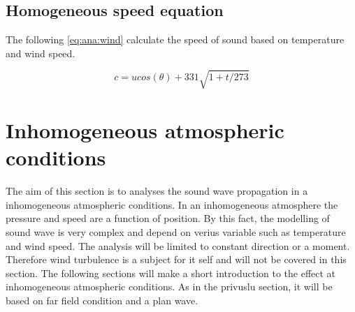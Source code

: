  
 \subsection{Homogeneous speed equation}
 The following \autoref{eq:ana:wind} calculate the speed of sound based on temperature and wind speed.

\begin{equation}\label{eq:ana:wind}
c = u cos(\theta) + 331 \sqrt{1+t/273}
\end{equation}  

\startexplain
{}
\stopexplain


 
\section{Inhomogeneous atmospheric conditions} 
The aim of this section is to analyses the sound wave propagation in a inhomogeneous atmospheric conditions. In an inhomogeneous atmosphere the pressure and speed are a function of position. By this fact, the modelling of sound wave is very complex and depend on verius variable such as temperature and wind speed. The analysis will be limited to constant direction or a moment. Therefore wind turbulence is a subject for it self and will not be covered in this section. The following sections will make a short introduction to the effect at inhomogeneous atmospheric conditions. As in the privuslu section, it will be based on far field condition and a plan wave.
 
 
